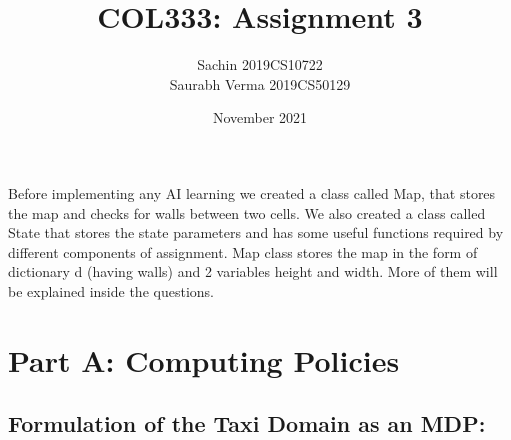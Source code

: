 \documentclass{article}
\title{COL333: Assignment 3}
\author{Sachin 2019CS10722\\ Saurabh Verma 2019CS50129 }
\date{November 2021}
\begin{document}
\maketitle


Before implementing any AI learning we created a class called Map, that stores the map and checks for walls between two cells. We also created a class called State that stores the state parameters and has some useful functions required by different components of assignment.
Map class stores the map in the form of dictionary d (having walls) and 2 variables height and width. More of them will be explained inside the questions.
\section{Part A: Computing Policies}


\subsection{Formulation of the Taxi Domain as an MDP:}
\end{document}
